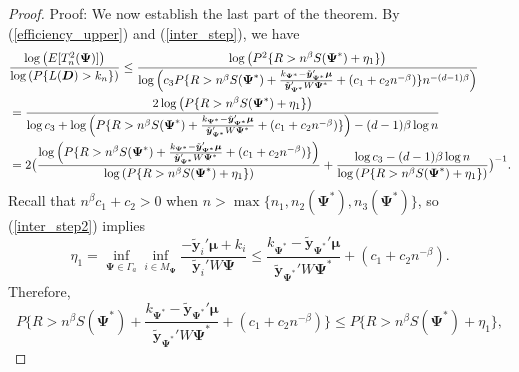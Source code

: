 \documentclass[final,11pt,3p]{article}\usepackage{setspace}
\begin{document}
\begin{proof}{Proof:}
We now establish the last part of the theorem.  By (\ref{efficiency_upper}) and (\ref{inter_step}), we have
\begin{align}
&\frac{\log \left(E[T_n^2(\boldsymbol{\Psi})]\right)}{\log \left({P}\{L(\boldsymbol{D}) > k_n\} \right)}  \le \frac{\log \left({P}^2\{ R >  n^{\beta} S(\boldsymbol{\Psi}^*) + \eta_1 \}\right) }{ \log \left(c_3 {P} \{ R > n^{\beta} S(\boldsymbol{\Psi}^*)+ \frac{k_{\boldsymbol{\Psi}^*}- \tilde{\boldsymbol{y}}_{\boldsymbol{\Psi}^*}' \boldsymbol{\mu}}{ \tilde{\boldsymbol{y}}_{\boldsymbol{\Psi}^*}' W \boldsymbol{\Psi}^*}+ (c_1 + c_2 n^{-\beta}) \} n^{-(d-1)\beta} \right) }  \notag \\
&=\frac{2 \log \left({P}\{ R >  n^{\beta} S(\boldsymbol{\Psi}^*) + \eta_1 \} \right) }{ \log c_3 + \log \left({P} \{ R > n^{\beta} S(\boldsymbol{\Psi}^*)+ \frac{k_{\boldsymbol{\Psi}^*}- \tilde{\boldsymbol{y}}_{\boldsymbol{\Psi}^*}' \boldsymbol{\mu}}{ \tilde{\boldsymbol{y}}_{\boldsymbol{\Psi}^*}' W \boldsymbol{\Psi}^*}+ (c_1 + c_2 n^{-\beta}) \} \right)-(d-1)\beta \log n }   \notag \\
& =2 \big(\frac{\log \left({P} \{ R > n^{\beta} S(\boldsymbol{\Psi}^*)+ \frac{k_{\boldsymbol{\Psi}^*}- \tilde{\boldsymbol{y}}_{\boldsymbol{\Psi}^*}' \boldsymbol{\mu}}{ \tilde{\boldsymbol{y}}_{\boldsymbol{\Psi}^*}' W \boldsymbol{\Psi}^*}+ (c_1 + c_2 n^{-\beta}) \} \right) }{\log \left({P}\{ R >  n^{\beta} S(\boldsymbol{\Psi}^*) + \eta_1 \} \right)}+\frac{\log c_3-(d-1)\beta \log n }{\log \left({P}\{ R >  n^{\beta} S(\boldsymbol{\Psi}^*) + \eta_1 \} \right) } \big)^{-1}. \label{cmc_limit}
\end{align}
Recall that $n^{\beta}c_1 + c_2 > 0$ when $n > \max \{n_1, n_2(\boldsymbol{\Psi}^*), n_3(\boldsymbol{\Psi}^*)\}$, so (\ref{inter_step2}) implies
\begin{equation*}
\eta_1 = \inf_{\boldsymbol{\Psi} \in \Gamma_a}\inf \limits_{i \in M_{\boldsymbol{\Psi}}} \frac{-  \tilde{\boldsymbol{y}}_i'\boldsymbol{\mu} + k_i}{ \tilde{\boldsymbol{y}}_i' W \boldsymbol{\Psi}} \le  \frac{k_{\boldsymbol{\Psi}^*}- \tilde{\boldsymbol{y}}_{\boldsymbol{\Psi}^*}' \boldsymbol{\mu}}{ \tilde{\boldsymbol{y}}_{\boldsymbol{\Psi}^*}' W \boldsymbol{\Psi}^*}+ (c_1 + c_2 n^{-\beta}).
\end{equation*}
Therefore,
\begin{equation*}
{P} \{ R > n^{\beta} S(\boldsymbol{\Psi}^*)+ \frac{k_{\boldsymbol{\Psi}^*}- \tilde{\boldsymbol{y}}_{\boldsymbol{\Psi}^*}' \boldsymbol{\mu}}{ \tilde{\boldsymbol{y}}_{\boldsymbol{\Psi}^*}' W \boldsymbol{\Psi}^*}+ (c_1 + c_2 n^{-\beta})\} \le {P} \{ R > n^{\beta} S(\boldsymbol{\Psi}^*)+ \eta_1\},

\end{equation*}
\end{proof}
\end{document}
